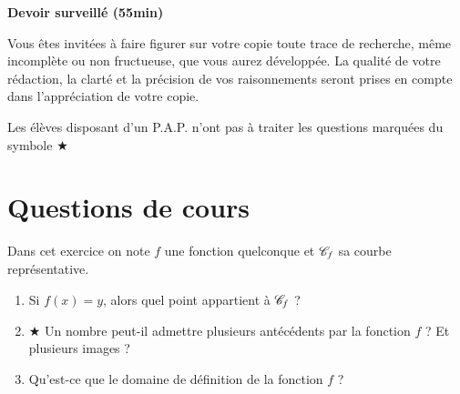 \documentclass[oneside,12pt]{exam}          %
\begin{document}
\footer{}{\footnotesize \etablissement}{}

\hrulefill\raisebox{-1.9pt}{\quad\decofourleft~\decosix~\decofourright \quad}\hrulefill

\begin{center}
	\textbf{\large Devoir surveillé  (55min)}
\end{center}
\vspace{-5pt}
Vous êtes invité\textperiodcentered e\textperiodcentered s à faire figurer sur votre copie toute trace de recherche, même incomplète ou non fructueuse, que vous aurez développée. La qualité de votre rédaction, la clarté et la précision de vos raisonnements seront prises en compte dans l’appréciation de votre copie.

Les élèves disposant d'un P.A.P. n'ont pas à traiter les questions marquées du symbole $\bigstar$

\vspace{-8pt}\hrulefill\raisebox{-1.9pt}{\quad\decofourleft~\decosix~\decofourright \quad}\hrulefill
\vspace{5pt}



\section{Questions de cours}
Dans cet exercice on note $f$ une fonction quelconque et ${\mathscr{C}}_f$ sa courbe représentative.
\begin{enumerate}
	\item Si $f(x)=y$, alors quel point appartient à ${\mathscr{C}}_f$  ?
	\item $\bigstar$ Un nombre peut-il admettre plusieurs antécédents par la fonction $f$ ? Et plusieurs images ?
	\item Qu'est-ce que le domaine de définition de la fonction $f$ ?
\end{enumerate}
\end{document}

